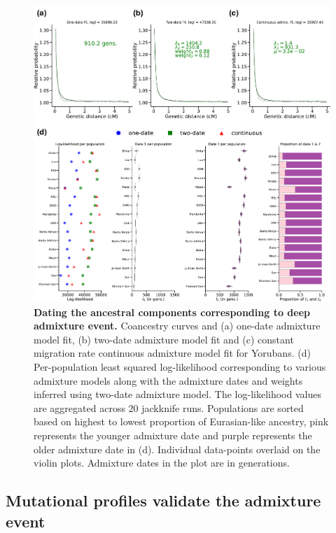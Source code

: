 \begin{figure}[h!]
    \centering
    \includegraphics[width=\linewidth]{figures/gb_deepadmix/gb_real_deep_3.pdf}
    \captionsetup{width=\textwidth+3cm}
    \caption{
    \footnotesize
    \textbf{Dating the ancestral components corresponding to deep admixture event.} Coancestry curves and (a) one-date admixture model fit, (b) two-date admixture model fit and (c) constant migration rate continuous admixture model fit for Yorubans. (d) Per-population least squared log-likelihood corresponding to various admixture models along with the admixture dates and weights inferred using two-date admixture model. The log-likelihood values are aggregated across $20$ jackknife runs. Populations are sorted based on highest to lowest proportion of Eurasian-like ancestry, pink represents the younger admixture date and purple represents the older admixture date in (d). Individual data-points overlaid on the violin plots. Admixture dates in the plot are in generations.
    }
    \label{fig:gb_deepadmix_3}
\end{figure}

\clearpage

\subsection{Mutational profiles validate the admixture event}
\label{sec:ch3-gb-deep-mut}

